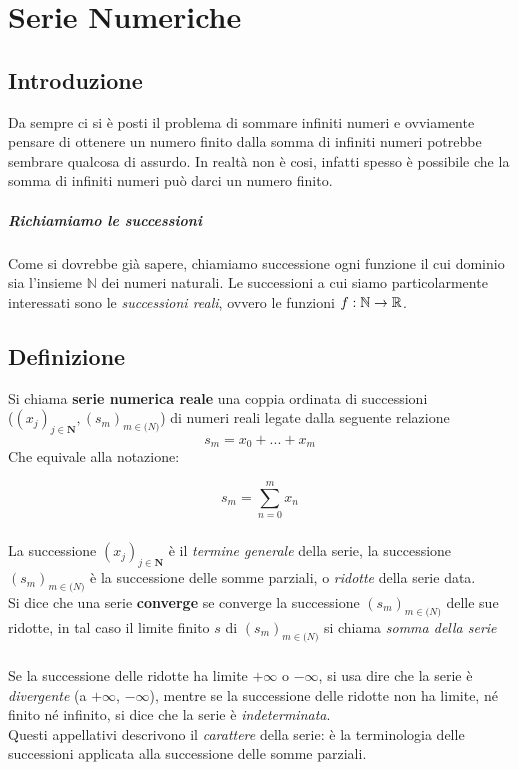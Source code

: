 \documentclass[12pt, a4paper, openany]{book}
\begin{document}
\chapter{Serie Numeriche}
\section{Introduzione}
Da sempre ci si è posti il problema di sommare infiniti numeri e ovviamente pensare di ottenere un numero finito dalla somma di infiniti numeri potrebbe sembrare qualcosa di assurdo.
In realtà non è cosi, infatti spesso è possibile che la somma di infiniti numeri può darci un numero finito.

\paragraph*{Richiamiamo le successioni}
Come si dovrebbe già sapere, chiamiamo successione ogni funzione il cui dominio sia l'insieme $\mathbb{N}$ dei numeri naturali.
Le successioni a cui siamo particolarmente interessati sono le \emph{successioni reali}, ovvero le funzioni $f : \mathbb{N} \rightarrow \mathbb{R}$.
\section{Definizione}
Si chiama \textbf{serie numerica reale} una coppia ordinata di successioni \\
($(x_j)_{j\in \mathbf{N}}, (s_m)_{m\in \mathbf(N)}$) di numeri reali legate dalla seguente relazione
\begin{equation*}
    s_m = x_0 + ... + x_m
\end{equation*}
Che equivale alla notazione:

\begin{equation*}
    \boxed{s_m = \sum_{n=0}^m x_n}
\end{equation*}
\paragraph*{}La successione $(x_j)_{j\in \mathbf{N}}$ è il \emph{termine generale} della serie, la successione $(s_m)_{m\in \mathbf(N)}$ è la successione delle somme parziali, o \emph{ridotte} della serie data.\\
Si dice che una serie \textbf{converge} se converge la successione $(s_m)_{m\in \mathbf(N)}$ delle sue ridotte, in tal caso il limite finito $s$ di $(s_m)_{m\in \mathbf(N)}$ si chiama \emph{somma della serie}
\paragraph*{}Se la successione delle ridotte ha limite $+ \infty$ o $- \infty$, si usa dire che la serie è \emph{divergente} (a $+ \infty$, $- \infty$), mentre se la successione delle ridotte non ha limite, né finito né infinito, si dice che la serie è \emph{indeterminata}.
\\Questi appellativi descrivono il \emph{carattere} della serie: è  la terminologia delle successioni applicata alla successione delle somme parziali. 
\end{document}
